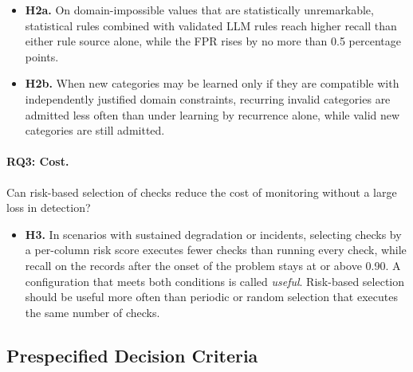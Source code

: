 \begin{itemize}
\item \textbf{H2a.} On domain-impossible values that are statistically unremarkable, statistical rules combined with validated LLM rules reach higher recall than either rule source alone, while the FPR rises by no more than 0.5 percentage points.
\item \textbf{H2b.} When new categories may be learned only if they are compatible with independently justified domain constraints, recurring invalid categories are admitted less often than under learning by recurrence alone, while valid new categories are still admitted.
\end{itemize}

\paragraph{RQ3: Cost.} Can risk-based selection of checks reduce the cost of monitoring without a large loss in detection?

\begin{itemize}
\item \textbf{H3.} In scenarios with sustained degradation or incidents, selecting checks by a per-column risk score executes fewer checks than running every check, while recall on the records after the onset of the problem stays at or above 0.90. A configuration that meets both conditions is called \emph{useful}. Risk-based selection should be useful more often than periodic or random selection that executes the same number of checks.
\end{itemize}

\subsection{Prespecified Decision Criteria}

